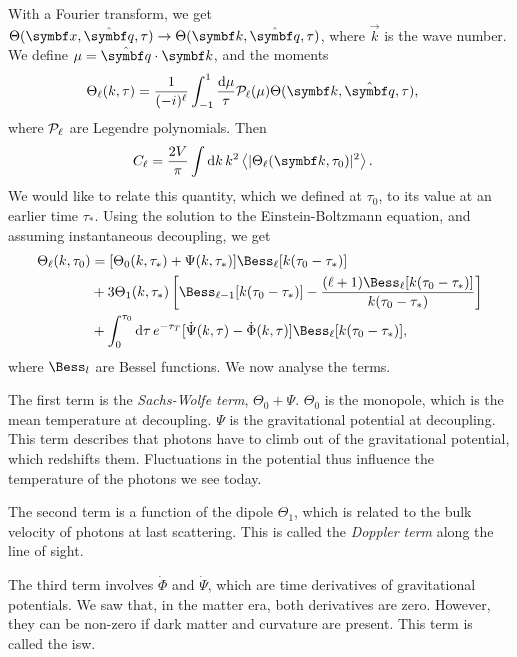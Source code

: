 With a Fourier transform, we get $\Theta(\vec{x}, \uvec{q}, \tau) \to \Theta(\vec{k}, \uvec{q}, \tau)$, where $\vec{k}$ is the wave number.
We define $\mu = \uvec{q} \cdot \vec{k}$, and the moments
\begin{align*}
	\Theta_\ell(k, \tau)
	&= \frac{1}{(-i)^\ell}
	\int_{-1}^1 \frac{\dd{\mu}}{\tau} \Leg_\ell(\mu) \Theta(\vec{k}, \uvec{q}, \tau),
\end{align*}
where $\mathcal{P}_\ell$ are Legendre polynomials. Then
\begin{align*}
	C_\ell
	&= \frac{2 V}{\pi} \int \dd{k} k^2 \avg{\abs{\Theta_\ell(\vec{k}, \tau_0)}^2}.
\end{align*}
We would like to relate this quantity, which we defined at $\tau_0$, to its value at an earlier time $\tau_*$. Using the solution to the Einstein-Boltzmann equation, and assuming instantaneous decoupling, we get
\begin{align*}
	\Theta_\ell(k, \tau_0)
	&= [\Theta_0(k, \tau_*) + \Psi(k, \tau_*)]
	\Bess_\ell [k(\tau_0 - \tau_*)]\\
	&+ 3 \Theta_1(k, \tau_*) 
	\left[ \Bess_{\ell-1} [k(\tau_0-\tau_*)]
	- \frac{(\ell+1) \Bess_\ell[k(\tau_0-\tau_*)]}{k (\tau_0-\tau_*)}
	\right]\\
	&+ \int_0^{\tau_0} \dd{\tau} e^{-\tau_T}
	[\dot{\Psi}(k,\tau) - \dot{\Phi}(k, \tau)]
	\Bess_\ell [k(\tau_0-\tau_*)]
	,
\end{align*}
where $\Bess_l$ are Bessel functions. We now analyse the terms.

The first term is the \emph{Sachs-Wolfe term}, $\Theta_0 + \Psi$. $\Theta_0$ is the monopole, which is the mean temperature at decoupling. $\Psi$ is the gravitational potential at decoupling. This term describes that photons have to climb out of the gravitational potential, which redshifts them. Fluctuations in the potential thus influence the temperature of the photons we see today.

The second term is a function of the dipole $\Theta_1$, which is related to the bulk velocity of photons at last scattering. This is called the \emph{Doppler term} along the line of sight.


The third term involves $\dot{\Phi}$ and $\dot{\Psi}$, which are time derivatives of gravitational potentials. We saw that, in the matter era, both derivatives are zero. However, they can be non-zero if dark matter and curvature are present. This term is called the \ac{isw}.

